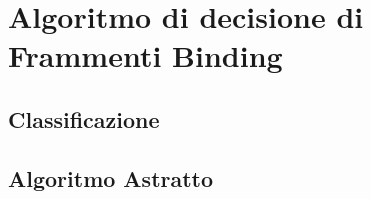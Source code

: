 \documentclass[./main.tex]{subfiles}
\begin{document}
\chapter{Algoritmo di decisione di Frammenti Binding}
\section{Classificazione}
\section{Algoritmo Astratto}
\end{document}
